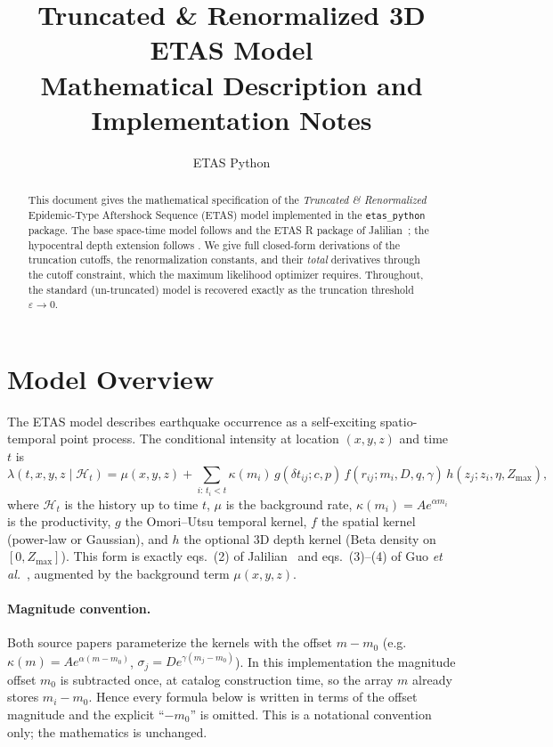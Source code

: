 \documentclass[11pt,a4paper]{article}
\title{\textbf{Truncated \& Renormalized 3D ETAS Model}\\
       \large Mathematical Description and Implementation Notes}
\author{ETAS Python}
\date{}
\theoremstyle{plain}
\theoremstyle{definition}
\newcommand{\dt}{\delta t}
\newcommand{\eps}{\varepsilon}
\newcommand{\Zmax}{Z_{\max}}
\newcommand{\bD}{\mathcal{H}}
\begin{document}
\maketitle

\begin{abstract}
This document gives the mathematical specification of the \emph{Truncated \&
Renormalized} Epidemic-Type Aftershock Sequence (ETAS) model implemented in the
\texttt{etas\_python} package. The base space-time model follows \citet{O98}
and the ETAS R package of Jalilian~\citep{J19}; the hypocentral depth extension
follows \citet{GZZ15}. We give full closed-form derivations
of the truncation cutoffs, the renormalization constants, and their
\emph{total} derivatives through the cutoff constraint, which the maximum
likelihood optimizer requires. Throughout, the standard (un-truncated) model is
recovered exactly as the truncation threshold $\eps\to 0$.
\end{abstract}

\tableofcontents

\section{Model Overview}

The ETAS model describes earthquake occurrence as a self-exciting
spatio-temporal point process. The conditional intensity at location $(x,y,z)$
and time $t$ is
\begin{equation}\label{eq:intensity}
\lambda(t,x,y,z\mid\bD_t)
= \mu(x,y,z)
  + \sum_{i:\,t_i<t} \kappa(m_i)\, g(\dt_{ij};c,p)\,
        f(r_{ij}; m_i,D,q,\gamma)\, h(z_j; z_i,\eta,\Zmax),
\end{equation}
where $\bD_t$ is the history up to time $t$, $\mu$ is the background rate,
$\kappa(m_i)=A e^{\alpha m_i}$ is the productivity, $g$ the Omori--Utsu temporal
kernel, $f$ the spatial kernel (power-law or Gaussian), and $h$ the optional
3D depth kernel (Beta density on $[0,\Zmax]$). This form is exactly eqs.~(2)
of Jalilian~\cite{J19} and eqs.~(3)--(4) of Guo \emph{et al.}~\cite{GZZ15},
augmented by the background term $\mu(x,y,z)$.

\paragraph{Magnitude convention.}
Both source papers parameterize the kernels with the offset
$m-m_0$ (e.g.\ $\kappa(m)=A e^{\alpha(m-m_0)}$, $\sigma_j=D e^{\gamma(m_j-m_0)}$).
In this implementation the magnitude offset $m_0$ is subtracted once, at
catalog construction time, so the array $m$ already stores
$m_i-m_0$. Hence every formula below is written in terms of the offset
magnitude and the explicit ``$-m_0$'' is omitted. This is a notational
convention only; the mathematics is unchanged.
\end{document}
